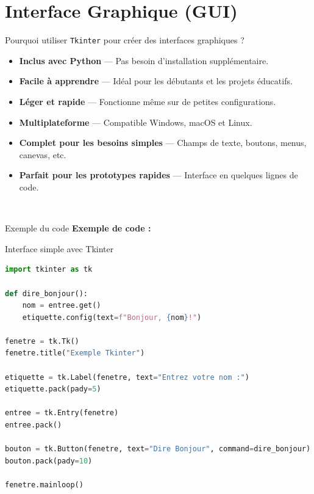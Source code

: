 \documentclass{beamer}
\begin{document}
\section{Interface Graphique (GUI)}
\begin{frame}{Pourquoi utiliser \texttt{Tkinter} pour créer des interfaces graphiques ?}
    \begin{itemize}
        \item \textbf{Inclus avec Python} — Pas besoin d’installation supplémentaire.
        \item \textbf{Facile à apprendre} — Idéal pour les débutants et les projets éducatifs.
        \item \textbf{Léger et rapide} — Fonctionne même sur de petites configurations.
        \item \textbf{Multiplateforme} — Compatible Windows, macOS et Linux.
        \item \textbf{Complet pour les besoins simples} — Champs de texte, boutons, menus, canevas, etc.
        \item \textbf{Parfait pour les prototypes rapides} — Interface en quelques lignes de code.
    \end{itemize}\
\end{frame}

\begin{frame}{Exemple du code}
    \vspace{0.3cm}
    \textbf{Exemple de code :}
    \begin{block}{Interface simple avec Tkinter}
    \begin{lstlisting}[language=Python, basicstyle=\ttfamily\footnotesize]
import tkinter as tk

def dire_bonjour():
    nom = entree.get()
    etiquette.config(text=f"Bonjour, {nom}!")

fenetre = tk.Tk()
fenetre.title("Exemple Tkinter")

etiquette = tk.Label(fenetre, text="Entrez votre nom :")
etiquette.pack(pady=5)

entree = tk.Entry(fenetre)
entree.pack()

bouton = tk.Button(fenetre, text="Dire Bonjour", command=dire_bonjour)
bouton.pack(pady=10)

fenetre.mainloop()
    \end{lstlisting}
    \end{block}
\end{frame}
\end{document}
